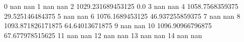 0 nan nan
1 nan nan
2 1029.231689453125 0.0
3 nan nan
4 1058.7568359375 29.525146484375
5 nan nan
6 1076.1689453125 46.937255859375
7 nan nan
8 1093.871826171875 64.64013671875
9 nan nan
10 1096.90966796875 67.677978515625
11 nan nan
12 nan nan
13 nan nan
14 nan nan

